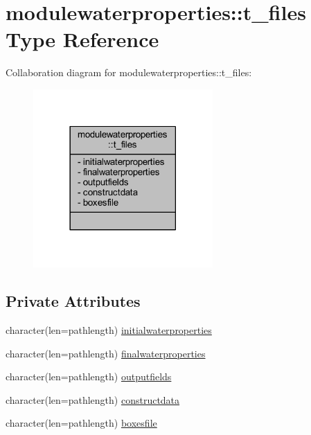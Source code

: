 \hypertarget{structmodulewaterproperties_1_1t__files}{}\section{modulewaterproperties\+:\+:t\+\_\+files Type Reference}
\label{structmodulewaterproperties_1_1t__files}


Collaboration diagram for modulewaterproperties\+:\+:t\+\_\+files\+:\nopagebreak
\begin{figure}[H]
\begin{center}
\leavevmode
\includegraphics[width=194pt]{structmodulewaterproperties_1_1t__files__coll__graph}
\end{center}
\end{figure}
\subsection*{Private Attributes}
\begin{DoxyCompactItemize}
\item 
character(len=pathlength) \mbox{\hyperlink{structmodulewaterproperties_1_1t__files_a28c144a3528134842524c81b16090dfc}{initialwaterproperties}}
\item 
character(len=pathlength) \mbox{\hyperlink{structmodulewaterproperties_1_1t__files_a136a6de1435179e1294e65691b32c2ef}{finalwaterproperties}}
\item 
character(len=pathlength) \mbox{\hyperlink{structmodulewaterproperties_1_1t__files_a2143f9132a2ba51231006e6b5ebe5441}{outputfields}}
\item 
character(len=pathlength) \mbox{\hyperlink{structmodulewaterproperties_1_1t__files_a87adc2e9f3502c4b8f86413571974bf3}{constructdata}}
\item 
character(len=pathlength) \mbox{\hyperlink{structmodulewaterproperties_1_1t__files_af0a83c9f7958c8d2f6d95acb0d165469}{boxesfile}}
\end{DoxyCompactItemize}


